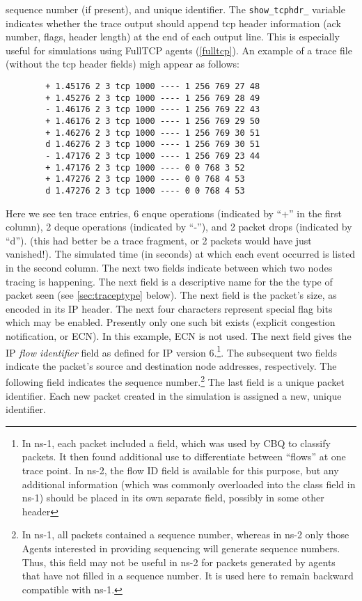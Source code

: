 sequence number (if present), and unique identifier.
The {\tt show\_tcphdr\_} variable indicates whether the trace
output should append tcp header information (ack number, flags, header length)
at the end of each output line.  This is especially useful for simulations
using FullTCP agents (\ref{fulltcp}).
An example of a trace file (without the tcp header fields) migh
appear as follows: 
\begin{small}
\begin{verbatim}
        + 1.45176 2 3 tcp 1000 ---- 1 256 769 27 48
        + 1.45276 2 3 tcp 1000 ---- 1 256 769 28 49
        - 1.46176 2 3 tcp 1000 ---- 1 256 769 22 43
        + 1.46176 2 3 tcp 1000 ---- 1 256 769 29 50
        + 1.46276 2 3 tcp 1000 ---- 1 256 769 30 51
        d 1.46276 2 3 tcp 1000 ---- 1 256 769 30 51
        - 1.47176 2 3 tcp 1000 ---- 1 256 769 23 44
        + 1.47176 2 3 tcp 1000 ---- 0 0 768 3 52
        + 1.47276 2 3 tcp 1000 ---- 0 0 768 4 53
        d 1.47276 2 3 tcp 1000 ---- 0 0 768 4 53
\end{verbatim}
\end{small}
Here we see ten trace entries, 6 enque operations (indicated by ``+''
in the first column), 2 deque operations (indicated by ``-''),
and 2 packet drops (indicated by ``d'').
(this had better be a trace fragment, or 2 packets would have just vanished!).
The simulated time (in seconds) at which each event occurred is listed
in the second column.
The next two fields indicate between which two nodes tracing is happening.
The next field is a descriptive name for the the type of packet seen
(see \ref{sec:traceptype} below).
The next field is the packet's size, as encoded in its IP header.
The next four characters represent special flag bits which may be
enabled.  Presently only one such bit exists (explicit congestion
notification, or {\sf ECN}).  In this example, {\sf ECN} is not used.
The next field gives the IP {\em flow identifier} field as defined
for IP version 6.\footnote{In ns-1, each packet included a 
field, which was used by CBQ to classify packets.
It then found additional use to differentiate between
``flows'' at one trace point.  In ns-2, the flow ID field is available
for this purpose, but any additional information (which was commonly overloaded
into the class field in ns-1) should be placed in its own separate field,
possibly in some other header}.
The subsequent two fields indicate the packet's source and destination
node addresses, respectively.
The following field indicates the sequence number.\footnote{In ns-1,
all packets contained a sequence number, whereas in ns-2 only those
Agents interested in providing sequencing will generate sequence numbers.
Thus, this field may not be useful in ns-2 for packets generated by
agents that have not filled in a sequence number.  It is used here
to remain backward compatible with ns-1.}
The last field is a unique packet identifier.  Each new packet
created in the simulation is assigned a new, unique identifier.

